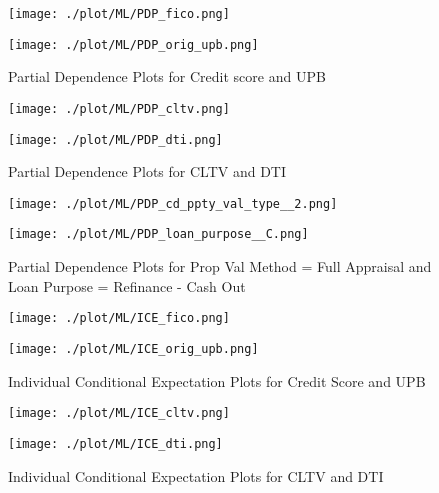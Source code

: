 \begin{figure}[H]
\begin{minipage}{.5\textwidth}
	\centering
	\texttt{[image: ./plot/ML/PDP\_fico.png]}
\end{minipage}%
\begin{minipage}{.5\textwidth}
	\centering
	\texttt{[image: ./plot/ML/PDP\_orig\_upb.png]}
\end{minipage}
    \caption{Partial Dependence Plots for Credit score and UPB}
    \label{fig:pdp_1}
\end{figure}

\begin{figure}[H]
\begin{minipage}{.5\textwidth}
	\centering
	\texttt{[image: ./plot/ML/PDP\_cltv.png]}
\end{minipage}%
\begin{minipage}{.5\textwidth}
	\centering
	\texttt{[image: ./plot/ML/PDP\_dti.png]}
\end{minipage}
    \caption{Partial Dependence Plots for CLTV and DTI}
\end{figure}

\begin{figure}[H]
\begin{minipage}{.5\textwidth}
	\centering
	\texttt{[image: ./plot/ML/PDP\_cd\_ppty\_val\_type\_\_2.png]}
\end{minipage}%
\begin{minipage}{.5\textwidth}
	\centering
	\texttt{[image: ./plot/ML/PDP\_loan\_purpose\_\_C.png]}
\end{minipage}
    \caption{Partial Dependence Plots for Prop Val Method = Full Appraisal and Loan Purpose = Refinance - Cash Out}
    \label{fig:pdp_2}
\end{figure}

\begin{figure}[H]
\begin{minipage}{.5\textwidth}
	\centering
	\texttt{[image: ./plot/ML/ICE\_fico.png]}
\end{minipage}%
\begin{minipage}{.5\textwidth}
	\centering
	\texttt{[image: ./plot/ML/ICE\_orig\_upb.png]}
\end{minipage}
    \caption{Individual Conditional Expectation Plots for Credit Score and UPB}
    \label{fig:ice_1}
\end{figure}

\begin{figure}[H]
\begin{minipage}{.5\textwidth}
	\centering
	\texttt{[image: ./plot/ML/ICE\_cltv.png]}
\end{minipage}%
\begin{minipage}{.5\textwidth}
	\centering
	\texttt{[image: ./plot/ML/ICE\_dti.png]}
\end{minipage}
    \caption{Individual Conditional Expectation Plots for CLTV and DTI}
    \label{fig:ice_2}
\end{figure}
